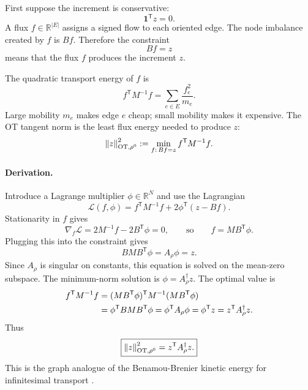 \documentclass[11pt]{article}
\numberwithin{equation}{section}
\newcommand{\R}{\mathbb{R}}
\newcommand{\ones}{\mathbf{1}}
\newcommand{\transpose}{^{\mathsf T}}
\newcommand{\pinv}{^{\dagger}}
\newcommand{\norm}[1]{\left\lVert #1\right\rVert}
\begin{document}
First suppose the increment is conservative:
\begin{equation}
  \ones\transpose z=0.
  \label{eq:conservative-increment}
\end{equation}
A flux $f\in\R^{|E|}$ assigns a signed flow to each oriented edge.  The node imbalance created by $f$ is $Bf$.  Therefore the constraint
\begin{equation}
  Bf=z
  \label{eq:Bf-z}
\end{equation}
means that the flux $f$ produces the increment $z$.

The quadratic transport energy of $f$ is
\begin{equation}
  f\transpose M^{-1}f=\sum_{e\in E}\frac{f_e^2}{m_e}.
  \label{eq:flux-energy}
\end{equation}
Large mobility $m_e$ makes edge $e$ cheap; small mobility makes it expensive.  The OT tangent norm is the least flux energy needed to produce $z$:
\begin{equation}
  \norm{z}_{\rm OT,\rho^0}^2
  :=\min_{f:\,Bf=z}f\transpose M^{-1}f.
  \label{eq:ot-primal}
\end{equation}

\paragraph{Derivation.}
Introduce a Lagrange multiplier $\phi\in\R^N$ and use the Lagrangian
\begin{equation}
  \mathcal L(f,\phi)
  =f\transpose M^{-1}f+2\phi\transpose(z-Bf).
  \label{eq:ot-lagrangian}
\end{equation}
Stationarity in $f$ gives
\begin{equation}
  \nabla_f\mathcal L=2M^{-1}f-2B\transpose\phi=0,
  \qquad\text{so}\qquad
  f=MB\transpose\phi.
  \label{eq:optimal-flux}
\end{equation}
Plugging this into the constraint gives
\begin{equation}
  BMB\transpose\phi=A_\rho\phi=z.
  \label{eq:poisson-phi}
\end{equation}
Since $A_\rho$ is singular on constants, this equation is solved on the mean-zero subspace.  The minimum-norm solution is $\phi=A_\rho\pinv z$.  The optimal value is
\begin{align}
  f\transpose M^{-1}f
  &=(MB\transpose\phi)\transpose M^{-1}(MB\transpose\phi)\notag\\
  &=\phi\transpose BMB\transpose\phi
  =\phi\transpose A_\rho\phi
  =\phi\transpose z
  =z\transpose A_\rho\pinv z.
  \label{eq:ot-tangent-value}
\end{align}
Thus
\begin{equation}
  \boxed{\norm{z}_{\rm OT,\rho^0}^2=z\transpose A_\rho\pinv z.}
  \label{eq:ot-tangent-boxed}
\end{equation}
This is the graph analogue of the Benamou-Brenier kinetic energy for infinitesimal transport \cite{Maas2011,Mielke2013,Leonard2016,PeyreCuturi2019}.
\end{document}
